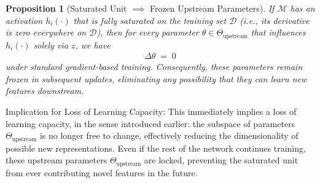 \documentclass[11pt]{article}
\newtheorem{proposition}{Proposition}[section]
\begin{document}
\begin{proposition}[Saturated Unit $\implies$ Frozen Upstream Parameters]
\label{prop:SaturatedUnitsFrozenUpstream}
If $\mathcal{M}$ has an activation $h_i(\cdot)$ that is fully saturated on the training set $\mathcal{D}$ (i.e., its derivative is zero everywhere on $\mathcal{D}$), then for every parameter $\theta\in \Theta_{\text{upstream}}$ that influences $h_i(\cdot)$ solely via $z$, we have
\begin{align*}
\Delta \theta \;=\; 0
\end{align*}
under standard gradient-based training. Consequently, these parameters remain frozen in subsequent updates, eliminating any possibility that they can learn new features downstream.
\end{proposition}

Implication for Loss of Learning Capacity: This immediately implies a loss of learning capacity, in the sense introduced earlier: the subspace of parameters $\Theta_{\text{upstream}}$ is no longer free to change, effectively reducing the dimensionality of possible new representations. Even if the rest of the network continues training, these upstream parameters $\Theta_{\text{upstream}}$ are locked, preventing the saturated unit from ever contributing novel features in the future.
\end{document}
